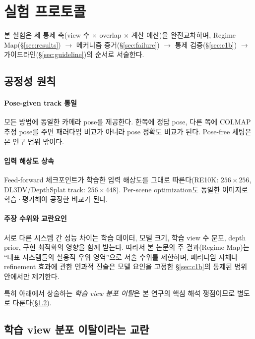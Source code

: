 \section{실험 프로토콜}
\label{sec:protocol}

본 실험은 세 통제 축(view 수 $\times$ overlap $\times$ 계산 예산)을 완전교차하며, Regime Map(\S\ref{sec:results}) $\to$ 메커니즘 증거(\S\ref{sec:failure}) $\to$ 통제 검증(\S\ref{sec:c1b}) $\to$ 가이드라인(\S\ref{sec:guideline})의 순서로 서술한다.

\subsection{공정성 원칙}

\paragraph{Pose-given track 통일} 모든 방법에 동일한 카메라 pose를 제공한다. 한쪽에 정답 pose, 다른 쪽에 COLMAP 추정 pose를 주면 패러다임 비교가 아니라 pose 정확도 비교가 된다. Pose-free 세팅은 본 연구 범위 밖이다.

\paragraph{입력 해상도 상속} Feed-forward 체크포인트가 학습한 입력 해상도를 그대로 따른다(RE10K: $256\times256$, DL3DV/DepthSplat track: $256\times448$). Per-scene optimization도 동일한 이미지로 학습·평가해야 공정한 비교가 된다.

\paragraph{주장 수위와 교란요인} 서로 다른 시스템 간 성능 차이는 학습 데이터, 모델 크기, 학습 view 수 분포, depth prior, 구현 최적화의 영향을 함께 받는다. 따라서 본 논문의 주 결과(Regime Map)는 ``대표 시스템들의 실용적 우위 영역''으로 서술 수위를 제한하며, 패러다임 자체나 refinement 효과에 관한 인과적 진술은 모델 요인을 고정한 \S\ref{sec:c1b}의 통제된 범위 안에서만 제기한다.

특히 아래에서 상술하는 \emph{학습 view 분포 이탈}은 본 연구의 핵심 해석 쟁점이므로 별도로 다룬다(\S\ref{sec:ood-confound}).

\subsection{학습 view 분포 이탈이라는 교란}
\label{sec:ood-confound}

